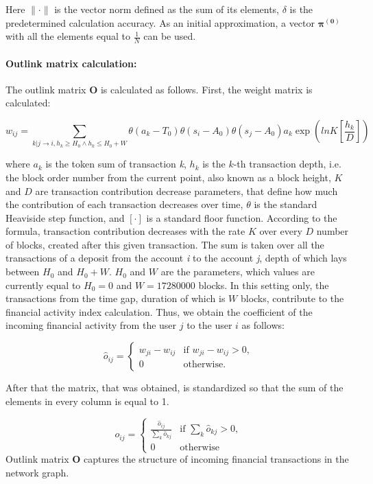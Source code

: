 \documentclass[a4paper,12pt]{article}
\begin{document}
Here $\lVert \cdot \rVert$ is the vector norm defined as the sum of its elements, $\delta$ is the predetermined calculation accuracy. As an initial approximation, a vector $\boldsymbol{\pi^{(0)}}$ with all the elements equal to $\frac{1}{N}$ can be used.



\paragraph{Outlink matrix calculation:}
The outlink matrix $\boldsymbol{O}$ is calculated as follows. First, the weight matrix is calculated:



$$
w_{ij}=\sum_{k|j \to i, {h_k \ge H_0} \land {h_k \le H_0+W}} \theta ( a_k - T_0 ) \theta ( s_i - A_0 ) \theta ( s_j - A_0 ) a_k \exp{(lnK [\frac{h_k}{D}])}
$$

where $a_k$ is the token sum of transaction \textit{k}, $h_k$ is the $k$-th transaction depth, i.e. the block order number from the current point, also known as a block height,  $K$ and $D$ are transaction contribution decrease parameters, that define how much the contribution of each transaction decreases over time, $\theta$ is the standard Heaviside step function, and $[ \cdot ]$ is a standard floor function. According to the formula, transaction contribution decreases with the rate $K$ over every $D$ number of blocks, created after this given transaction. The sum is taken over all the transactions of a deposit from the account \textit{i} to the account \textit{j}, depth of which lays between $H_0$ and $H_0+W$. $H_0$ and $W$ are the parameters, which values are currently equal to $H_0=0$ and $W=17280000$ blocks. In this setting only, the transactions from the time gap, duration of which is $W$ blocks, contribute to the financial activity index calculation. Thus, we obtain the coefficient of the incoming financial activity from the user $j$ to the user $i$ as follows:

$$
\hat{o}_{ij} = \begin{cases}
 w_{ji}-w_{ij}
 & \text{if $w_{ji}-w_{ij} > 0$,}\\
 0 & \text{otherwise.}
\end{cases}
$$

After that the matrix, that was obtained, is standardized so that the sum of the elements in every column is equal to 1.


$$
o_{ij} = \begin{cases}
 \frac{\hat{o}_{ij}} {\sum\limits_{k} \hat{o}_{kj}}
 & \text{if $\sum\limits_{k} \hat{o}_{kj}> 0$,}\\
 0 & \text{otherwise}
\end{cases} 
$$
Outlink matrix $\boldsymbol{O}$ captures the structure of incoming financial transactions in the network graph.
\end{document}
